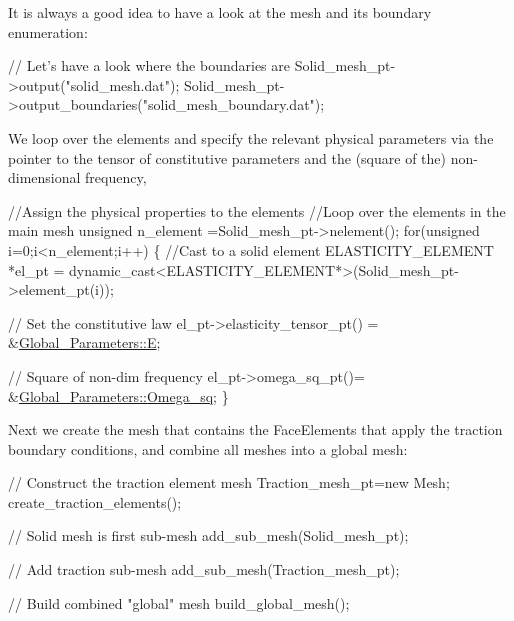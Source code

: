 It is always a good idea to have a look at the mesh and its boundary enumeration\+:


\begin{DoxyCodeInclude}
 \textcolor{comment}{// Let's have a look where the boundaries are}
 Solid\_mesh\_pt->output(\textcolor{stringliteral}{"solid\_mesh.dat"});
 Solid\_mesh\_pt->output\_boundaries(\textcolor{stringliteral}{"solid\_mesh\_boundary.dat"});

\end{DoxyCodeInclude}


We loop over the elements and specify the relevant physical parameters via the pointer to the tensor of constitutive parameters and the (square of the) non-\/dimensional frequency, 
\begin{DoxyCodeInclude}


 \textcolor{comment}{//Assign the physical properties to the elements}
 \textcolor{comment}{//Loop over the elements in the main mesh}
 \textcolor{keywordtype}{unsigned} n\_element =Solid\_mesh\_pt->nelement();
 \textcolor{keywordflow}{for}(\textcolor{keywordtype}{unsigned} i=0;i<n\_element;i++)
  \{
   \textcolor{comment}{//Cast to a solid element}
   ELASTICITY\_ELEMENT *el\_pt = 
    \textcolor{keyword}{dynamic\_cast<}ELASTICITY\_ELEMENT*\textcolor{keyword}{>}(Solid\_mesh\_pt->element\_pt(i));
   
   \textcolor{comment}{// Set the constitutive law}
   el\_pt->elasticity\_tensor\_pt() = &\hyperlink{namespaceGlobal__Parameters_aeeb26e11ef275bdfce14710e00290bb6}{Global\_Parameters::E};

   \textcolor{comment}{// Square of non-dim frequency}
   el\_pt->omega\_sq\_pt()= &\hyperlink{namespaceGlobal__Parameters_af9e1e178dfb7f5e35b452599bd4c4324}{Global\_Parameters::Omega\_sq};
  \}

\end{DoxyCodeInclude}


Next we create the mesh that contains the Face\+Elements that apply the traction boundary conditions, and combine all meshes into a global mesh\+:


\begin{DoxyCodeInclude}
 
 \textcolor{comment}{// Construct the traction element mesh}
 Traction\_mesh\_pt=\textcolor{keyword}{new} Mesh;
 create\_traction\_elements(); 
 
 \textcolor{comment}{// Solid mesh is first sub-mesh}
 add\_sub\_mesh(Solid\_mesh\_pt);

 \textcolor{comment}{// Add traction sub-mesh}
 add\_sub\_mesh(Traction\_mesh\_pt);

 \textcolor{comment}{// Build combined "global" mesh}
 build\_global\_mesh();

\end{DoxyCodeInclude}


